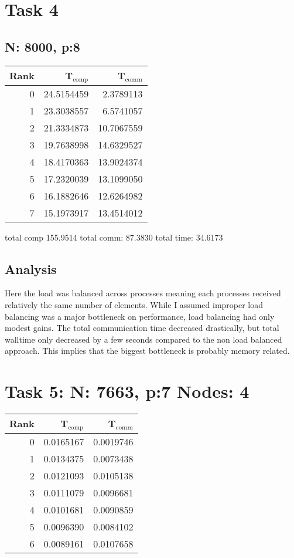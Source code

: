 \documentclass[11pt]{article}
\begin{document}
\section{Task 4}
\label{sec:orgb264614}

\subsection{N: 8000, p:8}
\label{sec:org02045ec}

\begin{center}
\begin{tabular}{rrr}
Rank & T\(_{\text{comp}}\) & T\(_{\text{comm}}\)\\
\hline
0 & 24.5154459 & 2.3789113\\
1 & 23.3038557 & 6.5741057\\
2 & 21.3334873 & 10.7067559\\
3 & 19.7638998 & 14.6329527\\
4 & 18.4170363 & 13.9024374\\
5 & 17.2320039 & 13.1099050\\
6 & 16.1882646 & 12.6264982\\
7 & 15.1973917 & 13.4514012\\
\end{tabular}
\end{center}

total comp 155.9514
total comm: 87.3830
total time: 34.6173

\subsection{Analysis}
\label{sec:org56077f6}

Here the load was balanced across processes meaning each processes received relatively the same number of elements. While I assumed improper load balancing was a major bottleneck on performance, load balancing had only modest gains. The total communication time decreased drastically, but total walltime only decreased by a few seconds compared to the non load balanced approach. This implies that the biggest bottleneck is probably memory related.

\section{Task 5: N: 7663, p:7 Nodes: 4}
\label{sec:orgf84686c}

\begin{center}
\begin{tabular}{rrr}
Rank & T\(_{\text{comp}}\) & T\(_{\text{comm}}\)\\
\hline
0 & 0.0165167 & 0.0019746\\
1 & 0.0134375 & 0.0073438\\
2 & 0.0121093 & 0.0105138\\
3 & 0.0111079 & 0.0096681\\
4 & 0.0101681 & 0.0090859\\
5 & 0.0096390 & 0.0084102\\
6 & 0.0089161 & 0.0107658\\
\end{tabular}
\end{center}
\end{document}
